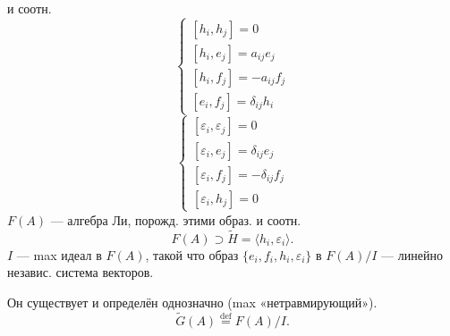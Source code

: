 и соотн.
\[
\begin{cases}
[h_i,h_j]=0\\
[h_i,e_j]=a_{ij}e_j\\
[h_i,f_j]=-a_{ij}f_j\\
[e_i,f_j]=\delta_{ij}h_i
\end{cases}
\]
\[
\begin{cases}
[\varepsilon_i,\varepsilon_j]=0\\
[\varepsilon_i,e_j]=\delta_{ij}e_j\\
[\varepsilon_i,f_j]=-\delta_{ij}f_j\\
[\varepsilon_i,h_j]=0
\end{cases}
\]
$F(A)$ --- алгебра Ли, порожд. этими образ. и соотн.
\[
F(A)\supset\widetilde H=\langle h_i,\varepsilon_i\rangle.
\]
$I$ --- max идеал в $F(A)$, такой что образ $\{e_i,f_i,h_i,\varepsilon_i\}$ в $F(A)/I$ --- линейно независ. система векторов.

Он существует и определён однозначно (max «нетравмирующий»).
\[
\widetilde G(A)\overset{\mathrm{def}}{=}F(A)/I.
\]


